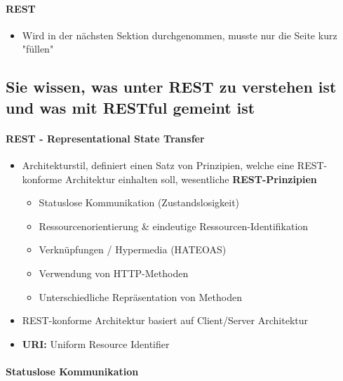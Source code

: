\documentclass[a4paper]{article}
\begin{document}
				\paragraph{REST}
				
					\begin{itemize}
						\item Wird in der nächsten Sektion durchgenommen, musste nur die Seite kurz "füllen"
					\end{itemize}
		
		\newpage
		
		\subsection{Sie wissen, was unter REST zu verstehen ist und was mit RESTful gemeint ist}
		
			\paragraph{REST - Representational State Transfer}
			
				\begin{itemize}
					\item Architekturstil, definiert einen Satz von Prinzipien, welche eine REST-konforme Architektur einhalten soll, wesentliche \textbf{REST-Prinzipien}
						\begin{itemize}
							\item Statuslose Kommunikation (Zustandslosigkeit)
							\item Ressourcenorientierung \& eindeutige Ressourcen-Identifikation
							\item Verknüpfungen / Hypermedia (HATEOAS)
							\item Verwendung von HTTP-Methoden
							\item Unterschiedliche Repräsentation von Methoden
						\end{itemize}
					\item REST-konforme Architektur basiert auf Client/Server Architektur
					\item \textbf{URI:} Uniform Resource Identifier
				\end{itemize}
			
			\paragraph{Statuslose Kommunikation}
			
\end{document}
